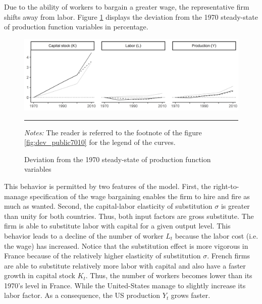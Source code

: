 Due to the ability of workers to bargain a greater wage, the representative firm shifts away from labor. Figure \ref{fig:dev_prod7010} displays the deviation from the 1970 steady-state of production function variables in percentage.
\begin{figure}[tb]
	\centering
	\includegraphics[width=1\linewidth]{../result/deviation/dev_prod7010.png}
	\caption{Deviation from the 1970 steady-state of production function variables}
	\label{fig:dev_prod7010}
	\vspace{.5ex}
	\hrule
	\vspace{-4ex}
	\justify\singlespacing\footnotesize \textit{Notes:} The reader is referred to the footnote of the figure \ref{fig:dev_public7010} for the legend of the curves.
\end{figure}
This behavior is permitted by two features of the model. First, the right-to-manage specification of the wage bargaining enables the firm to hire and fire as much as wanted. Second, the capital-labor elasticity of substitution $\sigma$ is greater than unity for both countries. Thus, both input factors are gross substitute. The firm is able to substitute labor with capital for a given output level. This behavior leads to a decline of the number of worker $L_t$ because the labor cost (i.e. the wage) has increased. Notice that the substitution effect is more vigorous in France because of the relatively higher elasticity of substitution $\sigma$. French firms are able to substitute relatively more labor with capital and also have a faster growth in capital stock $K_t$. Thus, the number of workers becomes lower than its 1970's level in France. While the United-States manage to slightly increase its labor factor. As a consequence, the US production $Y_t$ grows faster.

